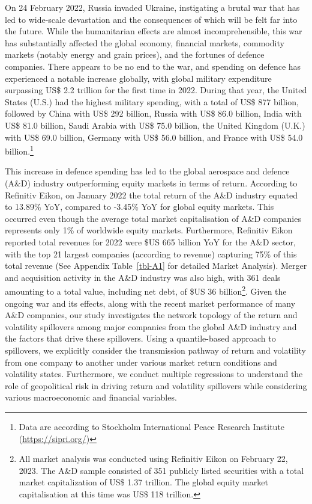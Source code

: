 \documentclass[
  letterpaper,
  DIV=11,
  numbers=noendperiod]{scrartcl}
\begin{document}
On 24 February 2022, Russia invaded Ukraine, instigating a brutal war
that has led to wide-scale devastation and the consequences of which
will be felt far into the future. While the humanitarian effects are
almost incomprehensible, this war has substantially affected the global
economy, financial markets, commodity markets (notably energy and grain
prices), and the fortunes of defence companies. There appears to be no
end to the war, and spending on defence has experienced a notable
increase globally, with global military expenditure surpassing US\$ 2.2
trillion for the first time in 2022. During that year, the United States
(U.S.) had the highest military spending, with a total of US\$ 877
billion, followed by China with US\$ 292 billion, Russia with US\$ 86.0
billion, India with US\$ 81.0 billion, Saudi Arabia with US\$ 75.0
billion, the United Kingdom (U.K.) with US\$ 69.0 billion, Germany with
US\$ 56.0 billion, and France with US\$ 54.0 billion.\footnote{Data are
  according to Stockholm International Peace Research Institute
  (\url{https://sipri.org/})}

This increase in defence spending has led to the global aerospace and
defence (A\&D) industry outperforming equity markets in terms of return.
According to Refinitiv Eikon, on January 2022 the total return of the
A\&D industry equated to 13.89\% YoY, compared to -3.45\% YoY for global
equity markets. This occurred even though the average total market
capitalisation of A\&D companies represents only 1\% of worldwide equity
markets. Furthermore, Refinitiv Eikon reported total revenues for 2022
were \$US 665 billion YoY for the A\&D sector, with the top 21 largest
companies (according to revenue) capturing 75\% of this total revenue
(See Appendix Table~\ref{tbl-A1} for detailed Market Analysis). Merger
and acquisition activity in the A\&D industry was also high, with 361
deals amounting to a total value, including net debt, of \$US 36
billion\footnote{All market analysis was conducted using Refinitiv Eikon
  on February 22, 2023. The A\&D sample consisted of 351 publicly listed
  securities with a total market capitalization of US\$ 1.37 trillion.
  The global equity market capitalisation at this time was US\$ 118
  trillion.}. Given the ongoing war and its effects, along with the
recent market performance of many A\&D companies, our study investigates
the network topology of the return and volatility spillovers among major
companies from the global A\&D industry and the factors that drive these
spillovers. Using a quantile-based approach to spillovers, we explicitly
consider the transmission pathway of return and volatility from one
company to another under various market return conditions and volatility
states. Furthermore, we conduct multiple regressions to understand the
role of geopolitical risk in driving return and volatility spillovers
while considering various macroeconomic and financial variables.
\end{document}
